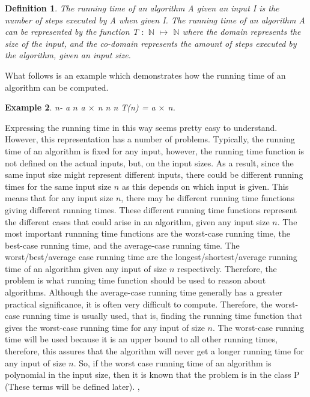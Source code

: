 \documentclass[12pt]{article}
\newtheorem{definition}{Definition}[subsection]
\newtheorem{example}[definition]{Example}
\numberwithin{equation}{subsection}
\numberwithin{table}{subsection}
\numberwithin{algorithm}{subsection}
\begin{document}
\begin{definition}
\label{running_time}
The running time of an algorithm A given an input I is the number of steps executed by A when given I. The running time of an algorithm A can be represented by the function T $:$ $\mathbb{N}$ $\mapsto$ $\mathbb{N}$ where the domain represents the size of the input, and the co-domain represents the amount of steps executed by the algorithm, given an input size. {}
\end{definition}
What follows is an example which demonstrates how the running time of an algorithm can be computed.
\begin{example}
\label{example_running}
{} n-{{}} a {} $\mathit{n}${} a $\times$ n {} n {} n {} T(n) = a $\times$ n. {}
\end{example}
Expressing the running time in this way seems pretty easy to understand. However, this representation has a number of problems. Typically, the running time of an algorithm is fixed for any input, however, the running time function is not defined on the actual inputs, but, on the input sizes. As a result, since the same input size might represent different inputs, there could be different running times for the same input size $\mathit{n}$ as this depends on which input is given. This means that for any input size $\mathit{n}$, there may be different running time functions giving different running times. These different running time functions represent the different cases that could arise in an algorithm, given any input size $\mathit{n}$. The most important runnning time functions are the worst-case running time, the best-case running time, and the average-case running time. The worst/best/average case running time are the longest/shortest/average running time of an algorithm given any input of size $\mathit{n}$ respectively. Therefore, the problem is what running time function should be used to reason about algorithms. Although the average-case running time generally has a greater practical significance, it is often very difficult to compute. Therefore, the worst-case running time is usually used, that is, finding the running time function that gives the worst-case running time for any input of size $\mathit{n}$. The worst-case running time will be used because it is an upper bound to all other running times, therefore, this assures that the algorithm will never get a longer running time for any input of size $\mathit{n}$. So, if the worst case running time of an algorithm is polynomial in the input size, then it is known that the problem is in the class P (These terms will be defined later).  \cite{cormen_leiserson_rivest_stein}, \cite{adamchik_2009}\\\\
\end{document}
